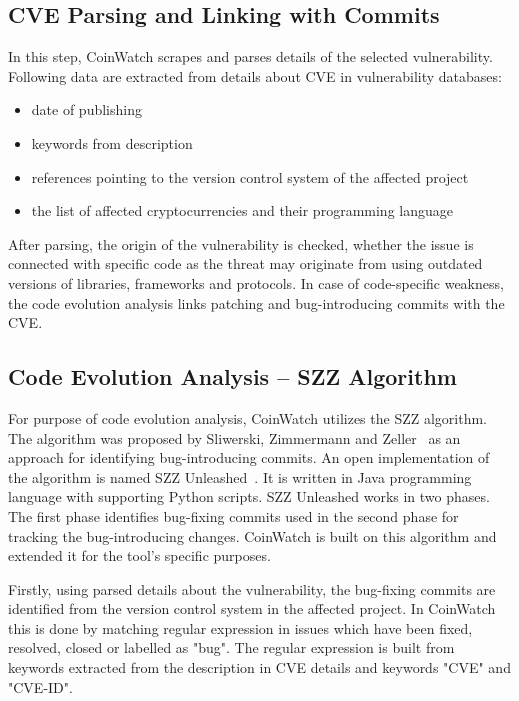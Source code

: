     \subsection*{CVE Parsing and Linking with Commits}
      In this step, CoinWatch scrapes and parses details of the selected vulnerability. Following data
      are extracted from details about CVE in vulnerability databases:
      \begin{itemize}
          \item date of publishing
          \item keywords from description
          \item references pointing to the version control system of the affected project
          \item the list of affected cryptocurrencies and their programming language
      \end{itemize}
      After parsing, the origin of the vulnerability is checked, whether the issue is connected with specific
      code as the threat may originate from using outdated versions of libraries, frameworks and protocols.
      In case of code-specific weakness, the code evolution analysis links patching and bug-introducing
      commits with the CVE.

  \subsection*{Code Evolution Analysis -- SZZ Algorithm}
    For purpose of code evolution analysis, CoinWatch utilizes the SZZ algorithm. The algorithm was proposed
    by Sliwerski, Zimmermann and Zeller~\cite{SZZalgorithm} as an approach for identifying bug-introducing
    commits. An open implementation of the algorithm is named SZZ Unleashed~\cite{SZZunleashed}. It is written
    in Java programming language with supporting Python scripts. SZZ Unleashed works in two phases. The first
    phase identifies bug-fixing commits used in the second phase for tracking the bug-introducing changes.
    CoinWatch is built on this algorithm and extended it for the tool's specific purposes.

    Firstly, using parsed details about the vulnerability, the bug-fixing commits are identified from
    the version control system in the affected project. In CoinWatch this is done by matching regular expression
    in issues which have been fixed, resolved, closed or labelled as "bug". The regular expression is built
    from keywords extracted from the description in CVE details and keywords "CVE" and "CVE-ID".


